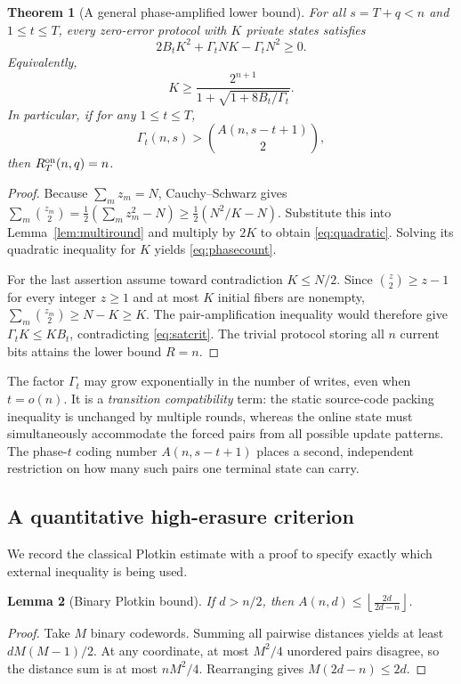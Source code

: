 \documentclass[11pt,a4paper]{article}
\newtheorem{theorem}{Theorem}[section]
\newtheorem{lemma}[theorem]{Lemma}
\begin{document}
\begin{theorem}[A general phase-amplified lower bound]\label{thm:amplified}
For all $s=T+q<n$ and $1\le t\le T$, every zero-error protocol with $K$ private states satisfies
\begin{equation}\label{eq:quadratic}
 2B_tK^2+\Gamma_t N K-\Gamma_t N^2\ge0.
\end{equation}
Equivalently,
\begin{equation}\label{eq:phasecount}
 \boxed{\quad K\ge\frac{2^{n+1}}{1+\sqrt{1+8B_t/\Gamma_t}}.\quad}
\end{equation}
In particular, if for any $1\le t\le T$,
\begin{equation}\label{eq:satcrit}
\boxed{\quad \Gamma_t(n,s)>\binom{A(n,s-t+1)}2,\quad}
\end{equation}
then $R_T^{\rm on}(n,q)=n$.
\end{theorem}
\begin{proof}
Because $\sum_mz_m=N$, Cauchy--Schwarz gives
$\sum_m\binom{z_m}2=\frac12(\sum_mz_m^2-N)\ge\frac12(N^2/K-N)$.
Substitute this into Lemma~\ref{lem:multiround} and multiply by $2K$ to obtain \eqref{eq:quadratic}. Solving its quadratic inequality for $K$ yields \eqref{eq:phasecount}.

For the last assertion assume toward contradiction $K\le N/2$. Since $\binom z2\ge z-1$ for every integer $z\ge1$ and at most $K$ initial fibers are nonempty, $\sum_m\binom{z_m}2\ge N-K\ge K$. The pair-amplification inequality would therefore give $\Gamma_t K\le K B_t$, contradicting \eqref{eq:satcrit}. The trivial protocol storing all $n$ current bits attains the lower bound $R=n$.
\end{proof}

The factor $\Gamma_t$ may grow exponentially in the number of writes, even when $t=o(n)$. It is a \emph{transition compatibility} term: the static source-code packing inequality is unchanged by multiple rounds, whereas the online state must simultaneously accommodate the forced pairs from all possible update patterns. The phase-$t$ coding number $A(n,s-t+1)$ places a second, independent restriction on how many such pairs one terminal state can carry.

\subsection{A quantitative high-erasure criterion}\label{subsec:plotkin}
We record the classical Plotkin estimate \cite{plotkin1960} with a proof to specify exactly which external inequality is being used.
\begin{lemma}[Binary Plotkin bound]\label{lem:plotkin}
If $d>n/2$, then $A(n,d)\le\left\lfloor\frac{2d}{2d-n}\right\rfloor$.
\end{lemma}
\begin{proof}
Take $M$ binary codewords. Summing all pairwise distances yields at least $dM(M-1)/2$. At any coordinate, at most $M^2/4$ unordered pairs disagree, so the distance sum is at most $nM^2/4$. Rearranging gives $M(2d-n)\le2d$.
\end{proof}
\end{document}
